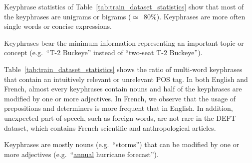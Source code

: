     Keyphrase statistics of Table~\ref{tab:train_dataset_statistics} show that
    most of the keyphrases are unigrams or bigrams ($\simeq$~$80\%$). Keyphrases
    are more often single words or concise expressions.
    
    \begin{property}\label{prop:informativity}
      Keyphrases bear the minimum information representing an important topic or
      concept (e.g.~``T-2 Buckeye'' instead of ``two-seat T-2 Buckeye'').
    \end{property}

    Table~\ref{tab:train_dataset_statistics} shows the ratio of multi-word
    keyphrases that contain an intuitively relevant or unrelevant POS tag. In
    both English and French, almost every keyphrases contain nouns and half of
    the keyphrases are modified by one or more adjectives. In French, we observe
    that the usage of prepositions and determiners is more frequent that in
    English. In addition, unexpected part-of-speech, such as foreign words, are
    not rare in the DEFT dataset, which contains French scientific and
    anthropological articles.

    \begin{property}\label{prop:noun_phrases}
      Keyphrases are mostly nouns (e.g.~``storms'') that can be modified by one
      or more adjectives (e.g.~``\underline{annual} hurricane forecast'').
    \end{property}

